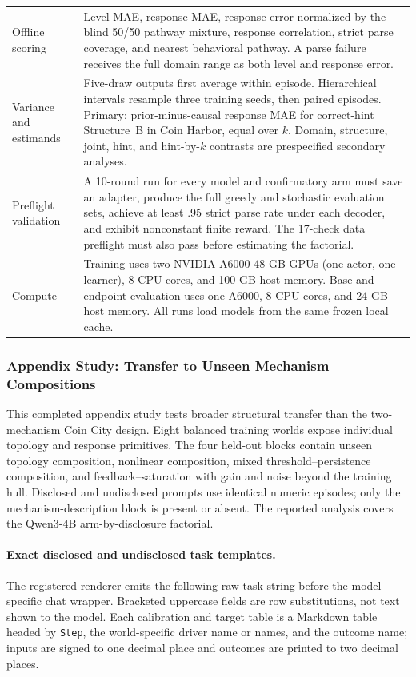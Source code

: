 \begin{center}
\begin{minipage}{\linewidth}
\begin{tabular}{p{.29\linewidth}p{.66\linewidth}}
Offline scoring & Level MAE, response MAE, response error normalized by the
blind 50/50 pathway mixture, response correlation, strict parse coverage, and
nearest behavioral pathway. A parse failure receives the full domain range as
both level and response error. \\
Variance and estimands & Five-draw outputs first average within episode.
Hierarchical intervals resample three training seeds, then paired episodes.
Primary: prior-minus-causal response MAE for correct-hint Structure~B in Coin
Harbor, equal over $k$. Domain, structure, joint, hint, and hint-by-$k$ contrasts
are prespecified secondary analyses. \\
Preflight validation & A 10-round run for every model and confirmatory arm must
save an adapter, produce the full greedy and stochastic evaluation sets, achieve
at least .95 strict parse rate under each decoder, and exhibit nonconstant finite
reward. The 17-check data preflight must also pass before estimating the factorial. \\
Compute & Training uses two NVIDIA A6000 48-GB GPUs (one actor, one learner),
8 CPU cores, and 100 GB host memory. Base and endpoint evaluation uses one A6000,
8 CPU cores, and 24 GB host memory. All runs load models from the same frozen
local cache. \\
\bottomrule
\end{tabular}
\end{minipage}
\end{center}

\subsubsection{Appendix Study: Transfer to Unseen Mechanism Compositions}
\label{app:exp3-expanded-structural-ood}

This completed appendix study tests broader structural transfer than the
two-mechanism Coin City design. Eight balanced training worlds expose individual
topology and response primitives. The four held-out blocks contain unseen topology
composition, nonlinear composition, mixed threshold--persistence composition, and
feedback--saturation with gain and noise beyond the training hull. Disclosed and
undisclosed prompts use identical
numeric episodes; only the mechanism-description block is present or absent. The
reported analysis covers the Qwen3-4B arm-by-disclosure factorial.

\paragraph{Exact disclosed and undisclosed task templates.}
\label{app:exp3-structural-prompts}
The registered renderer emits the following raw task string before the
model-specific chat wrapper. Bracketed uppercase fields are row substitutions,
not text shown to the model. Each calibration and target table is a Markdown
table headed by \texttt{Step}, the world-specific driver name or names, and the
outcome name; inputs are signed to one decimal place and outcomes are printed to
two decimal places.

